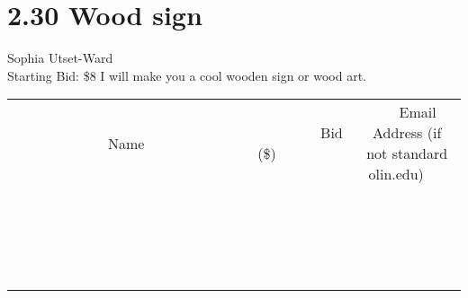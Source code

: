 \documentclass[11pt]{article}
\begin{document}
\section*{2.30 Wood sign}
Sophia Utset-Ward
\\
Starting Bid: \$8
\newline
I will make you a cool wooden sign or wood art.
\\[3ex]
\begin{tabular}{c c c}
~~~~~~~~~~~~~Name~~~~~~~~~~~~~ & ~~~~~~~~~Bid (\$)~~~~~~~~~  & ~~~Email Address (if not standard olin.edu)~~~\\
 & & \\
\hline
 & & \\
\hline
 & & \\
\hline
 & & \\
\hline
 & & \\
\hline
 & & \\
\hline
 & & \\
\hline
 & & \\
\hline
 & & \\
\hline
 & & \\
\hline
 & & \\
\hline
 & & \\
\hline
 & & \\
\hline
 & & \\
\hline
 & & \\
\hline
 & & \\
\hline
 & & \\
\hline
 & & \\
\hline
 & & \\
\hline
\end{tabular}
\newpage
\end{document}
